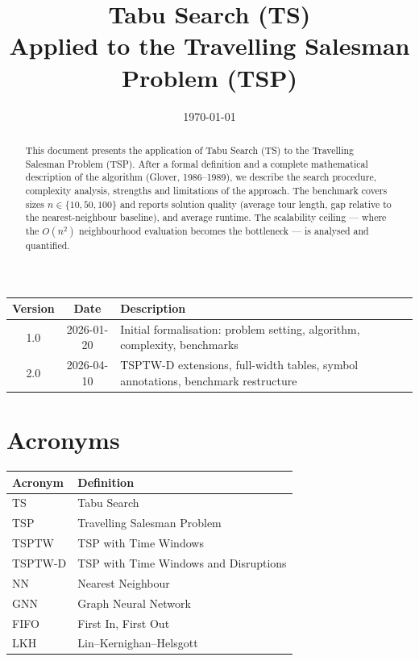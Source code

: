 \documentclass[12pt,a4paper]{article}
\title{%
  \LARGE\textbf{Tabu Search (TS)}\\[0.6em]
  \large Applied to the Travelling Salesman Problem (TSP)
}
\date{\today}
\begin{document}

\maketitle
\thispagestyle{empty}

\begin{center}
\begin{tabularx}{\linewidth}{ccX}
\toprule
\textbf{Version} & \textbf{Date} & \textbf{Description} \\
\midrule
1.0 & 2026-01-20 & Initial formalisation: problem setting, algorithm, complexity, benchmarks \\
2.0 & 2026-04-10 & TSPTW-D extensions, full-width tables, symbol annotations, benchmark restructure \\
\bottomrule
\end{tabularx}
\end{center}

\begin{abstract}
This document presents the application of Tabu Search (TS) to the
Travelling Salesman Problem (TSP).
After a formal definition and a complete mathematical description of the
algorithm (Glover, 1986--1989), we describe the search procedure, complexity
analysis, strengths and limitations of the approach.
The benchmark covers sizes $n \in \{10, 50, 100\}$ and reports solution
quality (average tour length, gap relative to the nearest-neighbour baseline),
and average runtime.
The scalability ceiling --- where the $O(n^2)$ neighbourhood evaluation becomes
the bottleneck --- is analysed and quantified.
\end{abstract}

\tableofcontents

\section*{Acronyms}

\begin{center}
\begin{tabularx}{\linewidth}{lX}
\toprule
\textbf{Acronym} & \textbf{Definition} \\
\midrule
TS      & Tabu Search \\
TSP     & Travelling Salesman Problem \\
TSPTW   & TSP with Time Windows \\
TSPTW-D & TSP with Time Windows and Disruptions \\
NN      & Nearest Neighbour \\
GNN     & Graph Neural Network \\
FIFO    & First In, First Out \\
LKH     & Lin--Kernighan--Helsgott \\
\bottomrule
\end{tabularx}
\end{center}
\end{document}
